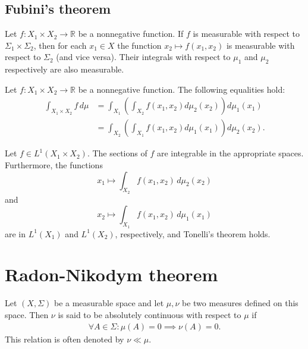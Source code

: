 \subsection{Fubini's theorem}

    \begin{property}
        Let $f:X_1\times X_2\rightarrow\mathbb{R}$ be a nonnegative function. If $f$ is measurable with respect to $\Sigma_1\times\Sigma_2$, then for each $x_1\in X$ the function $x_2\mapsto f(x_1,x_2)$ is measurable with respect to $\Sigma_2$ (and vice versa). Their integrals with respect to $\mu_1$ and $\mu_2$ respectively are also measurable.
    \end{property}

    \begin{theorem}[Tonelli]\label{lebesgue:tonelli_theorem}
        Let $f:X_1\times X_2\rightarrow\mathbb{R}$ be a nonnegative function. The following equalities hold:
        \begin{align}
            \int_{X_1\times X_2}f\,d\mu &= \int_{X_1}\left(\int_{X_2}f(x_1,x_2)d\mu_2(x_2)\right)d\mu_1(x_1)\nonumber\\
            &= \int_{X_2}\left(\int_{X_1}f(x_1,x_2)d\mu_1(x_1)\right)d\mu_2(x_2).
        \end{align}
    \end{theorem}

    \begin{result}[Fubini]
        Let $f\in L^1(X_1\times X_2)$. The sections of $f$ are integrable in the appropriate spaces. Furthermore, the functions \[x_1\mapsto\int_{X_2}f(x_1,x_2)\,d\mu_2(x_2)\] and \[x_2\mapsto\int_{X_1}f(x_1,x_2)\,d\mu_1(x_1)\] are in $L^1(X_1)$ and $L^1(X_2)$, respectively, and Tonelli's theorem holds.
    \end{result}

\section{Radon-Nikodym theorem}\label{section:Radon-Nikodym}

    \begin{definition}\label{lebesgue:absolute_continuity}
        Let $(X,\Sigma)$ be a measurable space and let $\mu,\nu$ be two measures defined on this space. Then $\nu$ is said to be absolutely continuous with respect to $\mu$ if
        \begin{gather}
            \forall A\in\Sigma:\mu(A) = 0\implies\nu(A) = 0.
        \end{gather}
        This relation is often denoted by $\nu\ll\mu$.
    \end{definition}

